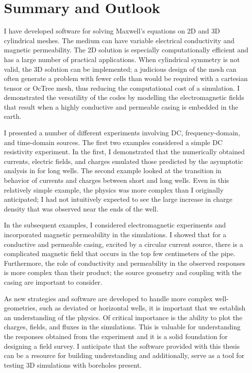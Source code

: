 \section{Summary and Outlook}

I have developed software for solving Maxwell's equations on 2D and 3D cylindrical meshes. The medium can have variable electrical conductivity and magnetic permeability. The 2D solution is especially computationally efficient and has a large number of practical applications. When cylindrical symmetry is not valid, the 3D solution can be implemented; a judicious design of the mesh can often generate a problem with fewer cells than would be required with a cartesian tensor or OcTree mesh, thus reducing the computational cost of a simulation. I demonstrated the versatility of the codes by modelling the electromagnetic fields that result when a highly conductive and permeable casing is embedded in the earth.

I presented a number of different experiments involving DC, frequency-domain, and time-domain sources. The first two examples considered a simple DC resistivity experiment. In the first, I demonstrated that the numerically obtained currents, electric fields, and charges emulated those predicted by the asymptotic analysis in \cite{Kaufman1990} for long wells. The second example looked at the transition in behavior of currents and charges between short and long wells. Even in this relatively simple example, the physics was more complex than I originally anticipated; I had not intuitively expected to see the large increase in charge density that was observed near the ends of the well.

In the subsequent examples, I considered electromagnetic experiments and incorporated magnetic permeability in the simulations. I showed that for a conductive and permeable casing, excited by a circular current source, there is a complicated magnetic field that occurs in the top few centimeters of the pipe. Furthermore, the role of conductivity and permeability in the observed responses is more complex than their product; the source geometry and coupling with the casing are important to consider.

As new strategies and software are developed to handle more complex well-geometries, such as deviated or horizontal wells, it is important that we establish an understanding of the physics. Of critical importance is the ability to plot the charges, fields, and fluxes in the simulations. This is valuable for understanding the responses obtained from the experiment and it is a solid foundation for designing a field survey. I anticipate that the software provided with this thesis can be a resource for building understanding and additionally, serve as a tool for testing 3D simulations with boreholes present.

